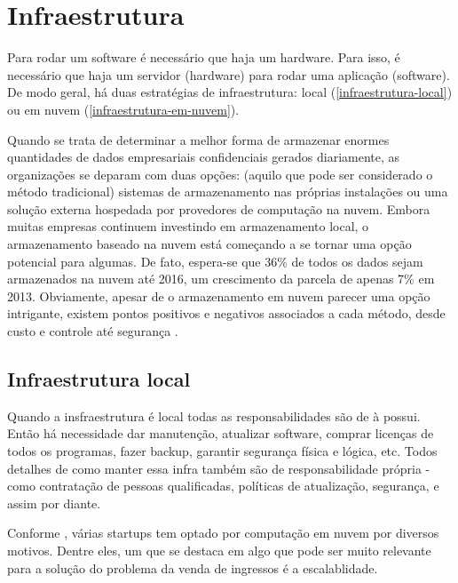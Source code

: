 \chapter{Infraestrutura}

Para rodar um software é necessário que haja um hardware. Para isso, é necessário
que haja um servidor (hardware) para rodar uma aplicação (software). De modo geral,
há duas estratégias de infraestrutura:
local (\autoref{infraestrutura-local}) ou em nuvem (\autoref{infraestrutura-em-nuvem}).

\begin{citacao}

Quando se trata de determinar a melhor forma de armazenar enormes quantidades de
dados empresariais confidenciais gerados diariamente, as organizações se deparam
com duas opções: (aquilo que pode ser considerado o método tradicional) sistemas
de armazenamento nas próprias instalações ou uma solução externa hospedada por
provedores de computação na nuvem. Embora muitas empresas continuem investindo
em armazenamento local, o armazenamento baseado na nuvem está começando a se
tornar uma opção potencial para algumas. De fato, espera-se que 36\% de todos
os dados sejam armazenados na nuvem até 2016, um crescimento da parcela de
apenas 7\% em 2013. Obviamente, apesar de o armazenamento em nuvem parecer
uma opção intrigante, existem pontos positivos e negativos associados a cada
método, desde custo e controle até segurança \cite{armazenamento-no-local-ou-na-nuvem}.

\end{citacao}

\section{Infraestrutura local}\label{infraestrutura-local}

Quando a insfraestrutura é local todas as responsabilidades são de à possui.
Então há necessidade dar manutenção,
atualizar software, comprar licenças de todos os programas, fazer backup, garantir
segurança física e lógica, etc. Todos detalhes de como manter essa infra
também são de responsabilidade própria - como contratação de pessoas qualificadas,
políticas de atualização, segurança, e assim por diante.

Conforme \cite{beneficios-da-computacao-em-nuvem-para-sua-startup}, várias startups
tem optado por computação em nuvem por diversos motivos. Dentre eles, um que se destaca
em algo que pode ser muito relevante para a solução do problema da venda de ingressos é
a escalablidade.

